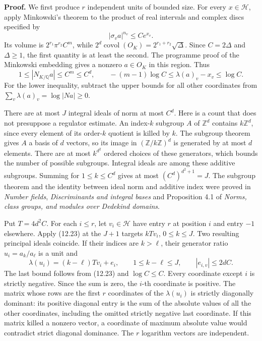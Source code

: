 \documentclass[
  11pt,
  a4paper,
]{article}
\begin{document}
\textbf{Proof.} We first produce \(r\) independent units of bounded
size. For every \(x\in\mathcal H\), apply Minkowski's theorem to the
product of real intervals and complex discs specified by \[
|\sigma_v a|^{n_v}\le Ce^{x_v}.
\] Its volume is \(2^{r_1}\pi^{r_2}C^m\), while
\(2^d\operatorname{covol}(O_K)=2^{r_1+r_2}\sqrt\Delta\). Since
\(C=2\Delta\) and \(\Delta\ge1\), the first quantity is at least the
second. The programme proof of the Minkowski embedding gives a nonzero
\(a\in O_K\) in this region. Thus \[
1\le |N_{K/\mathbb Q}a|\le C^m\le C^d,\qquad
-(m-1)\log C\le\lambda(a)_v-x_v\le\log C.
\tag{12.23}
\] For the lower inequality, subtract the upper bounds for all other
coordinates from \(\sum_v\lambda(a)_v=\log|Na|\ge0\).

There are at most \(J\) integral ideals of norm at most \(C^d\). Here is
a count that does not presuppose a regulator estimate. An index-\(k\)
subgroup \(A\) of \(\mathbb Z^d\) contains \(k\mathbb Z^d\), since every
element of its order-\(k\) quotient is killed by \(k\). The subgroup
theorem gives \(A\) a basis of \(d\) vectors, so its image in
\((\mathbb Z/k\mathbb Z)^d\) is generated by at most \(d\) elements.
There are at most \(k^{d^2}\) ordered choices of these generators, which
bounds the number of possible subgroups. Integral ideals are among these
additive subgroups. Summing for \(1\le k\le C^d\) gives at most
\((C^d)^{d^2+1}=J\). The subgroup theorem and the identity between ideal
norm and additive index were proved in \emph{Number fields},
\emph{Discriminants and integral bases} and Proposition 4.1 of
\emph{Norms, class groups, and modules over Dedekind domains}.

Put \(T=4d^2C\). For each \(i\le r\), let \(v_i\in\mathcal H\) have
entry \(r\) at position \(i\) and entry \(-1\) elsewhere. Apply (12.23)
at the \(J+1\) targets \(kTv_i\), \(0\le k\le J\). Two resulting
principal ideals coincide. If their indices are \(k>\ell\), their
generator ratio \(u_i=a_k/a_\ell\) is a unit and \[
\lambda(u_i)=(k-\ell)Tv_i+e_i,\qquad
1\le k-\ell\le J,\qquad |e_{i,v}|\le 2dC.
\tag{12.24}
\] The last bound follows from (12.23) and \(\log C\le C\). Every
coordinate except \(i\) is strictly negative. Since the sum is zero, the
\(i\)-th coordinate is positive. The matrix whose rows are the first
\(r\) coordinates of the \(\lambda(u_i)\) is strictly diagonally
dominant: its positive diagonal entry is the sum of the absolute values
of all the other coordinates, including the omitted strictly negative
last coordinate. If this matrix killed a nonzero vector, a coordinate of
maximum absolute value would contradict strict diagonal dominance. The
\(r\) logarithm vectors are independent.
\end{document}
